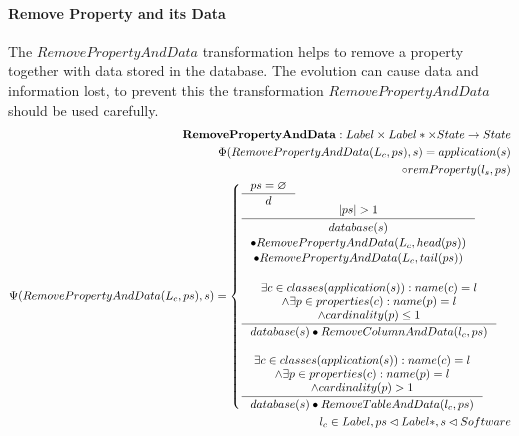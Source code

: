 \documentclass[11pt]{article}
\begin{document}
\paragraph{Remove Property and its Data} The $RemovePropertyAndData$ transformation helps to remove a property together with data stored in the database. The evolution can cause data and information lost, to prevent this the transformation $RemovePropertyAndData$ should be used carefully.
\begin{align*}
	\mathbf{RemovePropertyAndData} : Label \times Label* \times State \rightarrow State \\
	\Phi(RemovePropertyAndData(L_c, ps), s) = application(s)\\ \circ remProperty(l_s, ps) \\
	\Psi(RemovePropertyAndData(L_c, ps), s) = \begin{cases}
		\inference{ps = \varnothing}{d}\\
		\inference{|ps| > 1}{\begin{gathered}
			database(s) \\ \bullet RemovePropertyAndData(L_c, head(ps)) \\ \bullet RemovePropertyAndData(L_c, tail(ps))
	\end{gathered}}\\\\
 		\inference{\exists c \in classes(application(s)) : name(c) = l\\ 	\wedge \exists p \in properties(c) : name(p) = l \\ \wedge cardinality(p) \leq 1}{database(s) \bullet RemoveColumnAndData(l_c, ps)}\\\\
 	\inference{\exists c \in classes(application(s)) : name(c) = l\\ 	\wedge \exists p \in properties(c) : name(p) = l \\ \wedge cardinality(p) > 1}{database(s) \bullet RemoveTableAndData(l_c, ps)}
 \end{cases}
	\\
	l_c \in Label, ps \lhd Label*, s \lhd Software
\end{align*}
\end{document}
